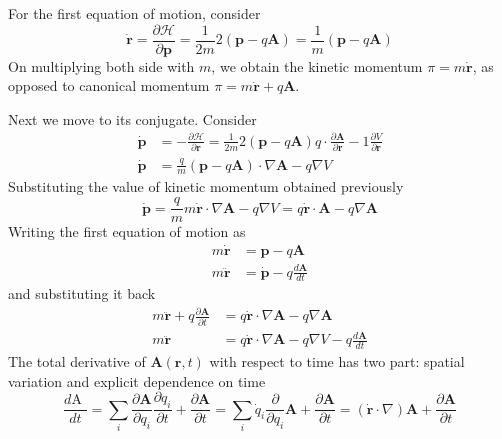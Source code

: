 \documentclass[../../../main.tex]{subfiles}
\begin{document}
For the first equation of motion, consider
\begin{equation*}
	\dot{\mathbf{r }}=\frac{\partial \mathcal{H }}{\partial \mathbf{p }}=\frac{1 }{2m }2 \left( \mathbf{p } -q \mathbf{A }	\right)=\frac{1 }{m }\left( \mathbf{p }-q \mathbf{A } \right)  
\end{equation*}
On multiplying both side with $m$, we obtain the kinetic momentum $\pi =m \dot{\mathbf{r }}$, as opposed to canonical momentum $\pi=m \dot{\mathbf{r }}+q \mathbf{A}$.

Next we move to its conjugate.
Consider 
\begin{align*}
	\dot{\mathbf{p }}&=-\frac{\partial \mathcal{ H }}{\partial \mathbf{r }}=\frac{1 }{2m }2 \left( \mathbf{p }-q \mathbf{A } \right) q \cdot  \frac{\partial \mathbf{A 		}}{\partial \mathbf{r }	}-1 \frac{\partial V }{\partial \mathbf{r }}\\
	\dot{\mathbf{p }}&=\frac{q }{m}\left( \mathbf{p } -q \mathbf{A }	\right)\cdot \nabla \mathbf{A } -q \nabla V
\end{align*}
Substituting the value of kinetic momentum obtained previously
\begin{equation*}
	\dot{\mathbf{p }}=\frac{q }{m }m \dot{\mathbf{r }}\cdot \nabla \mathbf{A }-q \nabla V=q \dot{\mathbf{r }}\cdot \mathbf{A }	-q \nabla \mathbf{A }
\end{equation*}
Writing the first equation of motion as 
\begin{align*}
	m \dot{\mathbf{r }}&=\mathbf{p}-q \mathbf{A }\\
	m \ddot{\mathbf{r }} &= \dot{\mathbf{p }}-q \frac{d\mathbf{A }}{d t}
\end{align*}
and substituting it back 
\begin{align*}
	m \ddot{\mathbf{r }}+q \frac{\partial \mathbf{A }}{\partial t }&=  q \dot{\mathbf{r }}\cdot \nabla \mathbf{A }-q \nabla \mathbf{A }\\
	m \ddot{\mathbf{r }}&=q \dot{\mathbf{r }}\cdot \nabla \mathbf{A } -q \nabla V -q \frac{d \mathbf{A }}{dt}
\end{align*}
The total derivative of $\mathbf{A}(\mathbf{r },t)$ with respect to time has two part: spatial variation and explicit dependence on time
\begin{equation*}
	\frac{d\mbox{A }}{dt}=\sum_i \frac{\partial \mathbf{A }}{\partial q_i}\frac{\partial q_i }{\partial t }+\frac{\partial \mathbf{A }}{\partial t }=\sum_i \dot{q}_i \frac{\partial }{\partial q_i }\mathbf{A}+ \frac{\partial \mathbf{A }}{\partial t }= \left( \dot{\mathbf{r }}\cdot \nabla\right)\mathbf{A}+ \frac{\partial \mathbf{A }}{\partial t}
\end{equation*}
\end{document}
